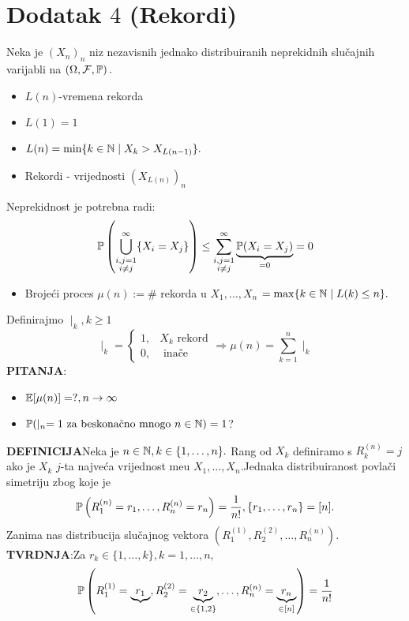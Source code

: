 \documentclass{article}
\begin{document}
\section{Dodatak \(4\) (Rekordi)}
Neka je \((X_n)_n\) niz nezavisnih jednako distribuiranih neprekidnih slučajnih varijabli na \(\left(\Omega,\mathcal F,\Bbb P\right).\)
\begin{itemize}
    \item[\ding{228}]\(L(n)\)-vremena rekorda
    \item[\ding{228}]\(L(1)=1\)
    \item[\ding{228}]\(L(n)=\min\{k\in\Bbb N\mid X_k>X_{L(n-1)}\}.\) 
    \item[\ding{228}]Rekordi - vrijednosti \((X_{L(n)})_n\) 
\end{itemize}
Neprekidnost je potrebna radi: \[\Bbb P\left(\bigcup_{\substack{i,j=1\\i\ne j}}^\infty\{X_i=X_j\}\right)\le\sum_{\substack{i,j=1\\i\ne j}}^\infty \underbrace{\Bbb P(X_i=X_j)}_{=0}=0\]
\begin{itemize}
    \item[\ding{228}] Brojeći proces \(\mu(n):=\#\) rekorda u \(X_1,\ldots,X_n\) \(=\max\{k\in\Bbb N\mid L(k)\le n\}.\)  
\end{itemize}
Definirajmo \(\mid_k,k\ge 1\) \[\mid_k=\begin{cases}1,&X_k\text{ rekord}\\0,&\text{ inače}\end{cases}\Rightarrow \mu(n)=\sum_{k=1}^n\mid_k\]
\textbf{PITANJA}:
\begin{itemize}
    \item[\ding{228}]\(\Bbb E[\mu(n)]=?,n\to\infty\)
    \item[\ding{228}]\(\Bbb P(\mid_n=1\text{ za beskonačno mnogo }n\in\Bbb N)=1\)?
\end{itemize}
\textbf{DEFINICIJA}\newline Neka je \(n\in\Bbb N,k\in\{1,\ldots,n\}.\) Rang od \(X_k\) definiramo s \(R_k^{(n)}=j\) ako je \(X_k\) \(j\)-ta najveća vrijednost me\dj{}u \(X_1,\ldots,X_n.\)\newline Jednaka distribuiranost povlači simetriju zbog koje je \[\Bbb P\left(R_1^{(n)}=r_1,\ldots,R_n^{(n)}=r_n\right)=\frac1{n!},\{r_1,\ldots,r_n\}=[n].\] Zanima nas distribucija slučajnog vektora \(\left(R_1^{(1)},R_2^{(2)},\ldots,R_n^{(n)}\right).\)\newline\textbf{TVRDNJA}:\newline Za \(r_k\in\{1,\ldots,k\},k=1,\ldots,n,\) \[\Bbb P\left(R_1^{(1)}=\underbrace{r_1},R_2^{(2)}=\underbrace{r_2}_{\in\{1,2\}},\ldots,R_n^{(n)}=\underbrace{r_n}_{\in[n]}\right)=\frac1{n!}\]
\end{document}
